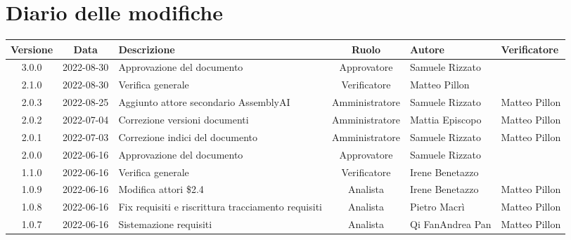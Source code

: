 \section*{Diario delle modifiche}
	\begin{center}
	\renewcommand{\arraystretch}{1.8} %
	\begin{longtable}{ |c|c|p{8em}|c|m{5em}|m{5em}| }
	\hline
	\textbf{Versione} & \textbf{Data} & \textbf{Descrizione} &  \textbf{Ruolo} &  \textbf{Autore} & \textbf{Verificatore}\\ %
	\hline
	3.0.0& 2022-08-30 & Approvazione del documento & Approvatore & Samuele \newline Rizzato & \\
	\hline
	2.1.0& 2022-08-30 & Verifica generale & Verificatore & Matteo \newline Pillon & \\
	\hline
	2.0.3& 2022-08-25 & Aggiunto attore secondario AssemblyAI & Amministratore & Samuele \newline Rizzato & Matteo \newline Pillon\\
	\hline
	2.0.2& 2022-07-04 & Correzione versioni documenti & Amministratore & Mattia \newline Episcopo & Matteo \newline Pillon\\
	\hline
	2.0.1 & 2022-07-03 & Correzione indici del documento & Amministratore & Samuele \newline Rizzato & Matteo \newline Pillon\\
	\hline
	2.0.0 & 2022-06-16 & Approvazione del documento & Approvatore & Samuele \newline Rizzato & \\
	\hline
	1.1.0 & 2022-06-16 & Verifica generale & Verificatore & Irene \newline Benetazzo & \\
	\hline
	1.0.9 & 2022-06-16 & Modifica attori \$2.4 & Analista & Irene \newline Benetazzo & Matteo \newline Pillon\\
	\hline
	1.0.8 & 2022-06-16 & Fix requisiti e riscrittura tracciamento requisiti & Analista & Pietro \newline Macrì & Matteo \newline Pillon\\
	\hline
	1.0.7 & 2022-06-16 & Sistemazione requisiti & Analista & Qi Fan\newline Andrea Pan & Matteo \newline Pillon\\

\end{longtable}
\end{center}
